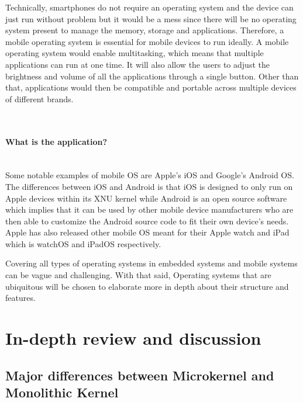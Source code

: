 \documentclass[conference]{IEEEtran}
\newcommand{\forceindent}{\leavevmode{\parindent=1em\indent}}
\begin{document}
\medskip
\forceindent Technically, smartphones do not require an operating system and the device can just run without problem but it would be a mess since there will be no operating system present to manage the memory, storage and applications. Therefore, a mobile operating system is essential for mobile devices to run ideally. A mobile operating system would enable multitasking, which means that multiple applications can run at one time. It will also allow the users to adjust the brightness and volume of all the applications through a single button. Other than that, applications would then be compatible and portable across multiple devices of different brands.

\\
\medskip
\paragraph{What is the application?}\mbox{} \\
\forceindent Some notable examples of mobile OS are Apple’s iOS and Google’s Android OS. The differences between iOS and Android is that iOS is designed to only run on Apple devices within its XNU kernel while Android is an open source software which implies that it can be used by other mobile device manufacturers who are then able to customize the Android source code to fit their own device’s needs. Apple has also released other mobile OS meant for their Apple watch and iPad which is watchOS and iPadOS respectively\cite{CSMOS}.


\smallskip
\forceindent Covering all types of operating systems in embedded systems and mobile systems can be vague and challenging. With that said, Operating  systems  that are ubiquitous will be chosen to elaborate more in depth about their structure and features.


\medskip
\section{In-depth review and discussion}

\subsection{Major differences between Microkernel and Monolithic Kernel}
\end{document}
